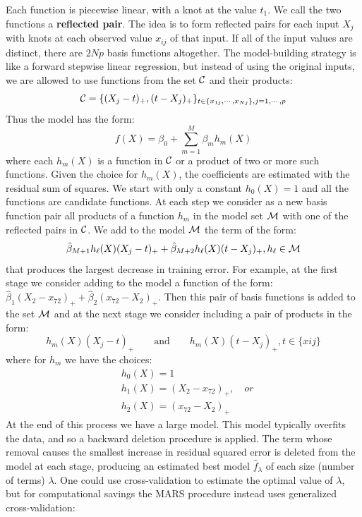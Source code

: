 \documentclass[12pt, letterpaper]{article}
\theoremstyle{definition}
\begin{document}
Each function is piecewise linear, with a knot at the value $t_1$. We call the two functions a \textbf{reflected pair}. The idea is to form reflected pairs for each input $X_j$ with knots at each observed value $x_{ij}$ of that input. If all of the input values are distinct, there are $2Np$ basis functions altogether.
The model-building strategy is like a forward stepwise linear regression, but instead of using the original inputs, we are allowed to use functions from the set $\CMcal{C}$ and their products:
\begin{equation}
\CMcal{C} = \{(X_j-t)_+, (t-X_j)_+\}_{t \in \{x_{1j},\cdots, x_{Nj}\}, j=1,\cdots,p}
\end{equation}
Thus the model has the form:
\begin{equation}
f(X) = \beta_0 + \sum_{m=1}^M \beta_m h_m(X)
\end{equation}
where each $h_m(X)$ is a function in $\CMcal{C}$ or a product of two or more such functions. Given the choice for $h_m(X)$, the coefficients are estimated with the residual sum of squares. We start with only a constant $h_0(X)=1$ and all the functions are candidate functions. At each step we consider as a new basis function pair all products of a function $h_m$ in the model set $\CMcal{M}$ with one of the reflected pairs in $\CMcal{C}$. We add to the model $\CMcal{M}$ the term of the form:
\begin{equation}
\hat{\beta}_{M+1}h_\ell(X) (X_j-t)_+ + \hat{\beta}_{M+2}h_\ell(X) (t-X_j)_+, h_\ell \in \CMcal{M}
\end{equation}
that produces the largest decrease in training error. For example, at the first stage we consider adding to the model a function of the form: $\hat{\beta}_1 (X_2-x_{72})_+ + \hat{\beta}_2(x_{72}-X_2)_+$. Then this pair of basis functions is added to the set $\CMcal{M}$ and at the next stage we consider including a pair of products in the form:
\begin{equation}
h_m(X) (X_j-t)_+ \quad\quad \text{and}\quad\quad h_m(X) (t-X_j)_+, t \in \{x{ij}\}
\end{equation}
where for $h_m$ we have the choices:
\begin{equation}
\begin{aligned}
&h_0(X) = 1\\
&h_1(X) = (X_2 - x_{72})_+,  \quad\textit{or}\\
&h_2(X) = (x_{72} - X_2)_+
\end{aligned}
\end{equation}
At the end of this process we have a large model. This model typically overfits the data, and so a backward deletion procedure is applied. The term whose removal causes the smallest increase in residual squared error is deleted from the model at each stage, producing an estimated best model $\hat{f}_\lambda$ of each size (number of terms) $\lambda$. One could use cross-validation to estimate the optimal value of $\lambda$, but for computational savings the MARS procedure instead uses generalized cross-validation:
\end{document}

